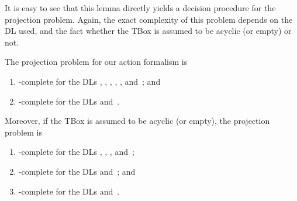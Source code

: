 \noindent
It is easy to see that this lemma directly yields a decision procedure for the
projection problem.  Again, the exact complexity of this problem depends on the
DL used, and the fact whether the TBox is assumed to be acyclic (or empty) or
not.

\begin{theorem}\label{thm:projection-complexity}
    The projection problem for our action formalism is
    \begin{enumerate}
        \item\label{enum:part-prj-tbox-alc}
            \ExpTime-complete for the DLs \ALC, \ALCO, \ALCI, \ALCIO, \ALCQ,
            and~\ALCQO; and
        \item\label{enum:part-prj-tbox-alcqio}
            \coNExpTime-complete for the DLs \ALCQI and~\ALCQIO.
    \end{enumerate}
    Moreover, if the TBox is assumed to be acyclic (or empty), the projection
    problem is
    \begin{enumerate}[resume]
        \item\label{enum:part-prj-alcqo}
            \PSpace-complete for the DLs \ALC, \ALCO, \ALCQ, and~\ALCQO;
        \item\label{enum:part-prj-alcio}
            \ExpTime-complete for the DLs \ALCI and~\ALCIO; and
        \item\label{enum:part-prj-alcqio}
            \coNExpTime-complete for the DLs \ALCQI and~\ALCQIO.
    \end{enumerate}
\end{theorem}

